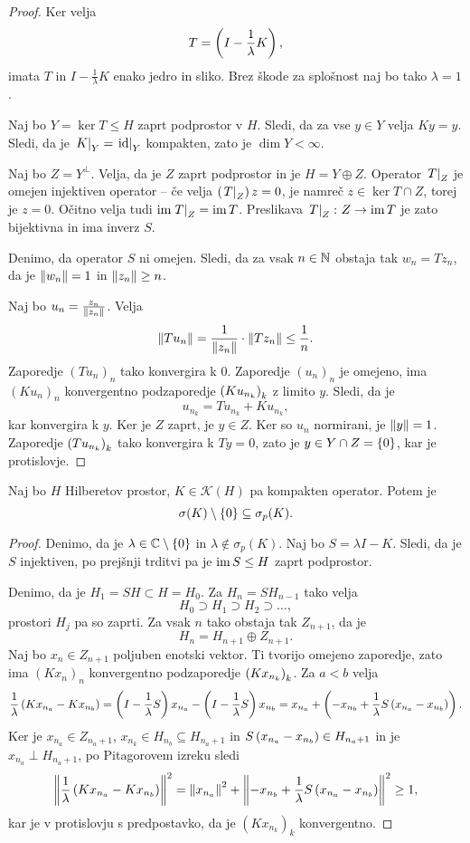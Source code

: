 \begin{proof}
Ker velja
\[
T = \left(I - \frac{1}{\lambda} K\right),
\]
imata $T$ in $I - \frac{1}{\lambda} K$ enako jedro in sliko. Brez
škode za splošnost naj bo tako $\lambda = 1$.

Naj bo $Y = \ker T \leq H$ zaprt podprostor v $H$. Sledi, da za vse
$y \in Y$ velja $Ky = y$. Sledi, da je
$\left. K\right|_{Y}^{} = \left. \operatorname{id}\right|_{Y}^{}$ kompakten, zato je
$\dim Y < \infty$.

Naj bo $Z = Y^\bot$. Velja, da je $Z$ zaprt podprostor in je
$H = Y \oplus Z$. Operator $\left. T\right|_{Z}^{}$ je omejen injektiven
operator -- če velja $\left(\left. T\right|_{Z}^{}\right)z = 0$, je namreč
$z \in \ker T \cap Z$, torej je $z = 0$. Očitno velja tudi
$\operatorname{im} \left. T\right|_{Z}^{} = \operatorname{im} T$. Preslikava
$\left. T\right|_{Z}^{} \colon Z \to \operatorname{im} T$ je zato bijektivna in ima inverz
$S$.

Denimo, da operator $S$ ni omejen. Sledi, da za vsak $n \in \mathbb{N}$
obstaja tak $w_n = Tz_n$, da je $\left\lVert w_n\right\rVert = 1$ in
$\left\lVert z_n\right\rVert \geq n$.

Naj bo $u_n = \frac{z_n}{\left\lVert z_n\right\rVert}$. Velja
\[
\left\lVert Tu_n\right\rVert = \frac{1}{\left\lVert z_n\right\rVert} \cdot \left\lVert Tz_n\right\rVert \leq
\frac{1}{n}.
\]
Zaporedje $(Tu_n)_n$ tako konvergira k $0$. Zaporedje $(u_n)_n$ je
omejeno, ima $(Ku_n)_n$ konvergentno podzaporedje $\left(Ku_{n_k}\right)_k$
z limito $y$. Sledi, da je
\[
u_{n_k} = T u_{n_k} + K u_{n_k},
\]
kar konvergira k $y$. Ker je $Z$ zaprt, je $y \in Z$. Ker so $u_n$
normirani, je $\left\lVert y\right\rVert = 1$. Zaporedje $\left(T u_{n_k}\right)_k$
tako konvergira k $Ty = 0$, zato je $y \in Y \cap Z = \left\{0\right\}$,
kar je protislovje.
\end{proof}

\begin{trditev}
Naj bo $H$ Hilberetov prostor, $K \in \mathcal{K}(H)$ pa kompakten
operator. Potem je
\[
\sigma(K) \setminus \left\{0\right\} \subseteq \sigma_p(K).
\]
\end{trditev}

\begin{proof}
Denimo, da je $\lambda \in \mathbb{C} \setminus \left\{0\right\}$ in
$\lambda \not \in \sigma_p(K)$. Naj bo $S = \lambda I - K$. Sledi,
da je $S$ injektiven, po prejšnji trditvi pa je $\operatorname{im} S \leq H$
zaprt podprostor.

Denimo, da je $H_1 = SH \subset H = H_0$. Za $H_n = SH_{n-1}$ tako
velja
\[
H_0 \supset H_1 \supset H_2 \supset \dots,
\]
prostori $H_j$ pa so zaprti. Za vsak $n$ tako obstaja tak
$Z_{n+1}$, da je
\[
H_n = H_{n+1} \oplus Z_{n+1}.
\]
Naj bo $x_n \in Z_{n+1}$ poljuben enotski vektor. Ti tvorijo
omejeno zaporedje, zato ima $(Kx_n)_n$ konvergentno podzaporedje
$\left(Kx_{n_k}\right)_k$. Za $a < b$ velja
\[
\frac{1}{\lambda} \left(Kx_{n_a} - Kx_{n_b}\right) =
\left(I - \frac{1}{\lambda} S\right) x_{n_a} -
\left(I - \frac{1}{\lambda} S\right) x_{n_b} =
x_{n_a} + \left(-x_{n_b} +
\frac{1}{\lambda} S \left(x_{n_a} - x_{n_b}\right)\right).
\]
Ker je $x_{n_a} \in Z_{n_a+1}$,
$x_{n_k} \in H_{n_b} \subseteq H_{n_a+1}$ in
$S \left(x_{n_a} - x_{n_b}\right) \in H_{n_a+1}$ in je
$x_{n_a} \perp H_{n_a + 1}$, po Pitagorovem izreku sledi
\[
\left\lVert \frac{1}{\lambda} \left(Kx_{n_a} - Kx_{n_b}\right)\right\rVert^2 =
\left\lVert x_{n_a}\right\rVert^2 +
\left\lVert -x_{n_b} + \frac{1}{\lambda} S \left(x_{n_a} - x_{n_b}\right)\right\rVert^2 \geq
1,
\]
kar je v protislovju s predpostavko, da je $(K x_{n_k})_k$
konvergentno.
\end{proof}

